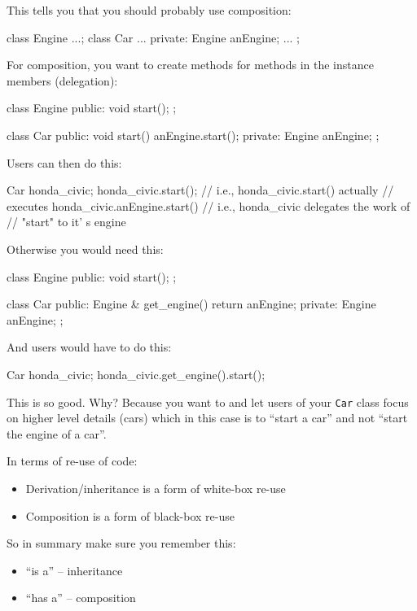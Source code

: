 This tells you that you should probably use composition:
\begin{console}
class Engine {...};
class Car {
...
private:
        Engine anEngine;
        ...
};
\end{console}

For composition, you want to create methods for methods in the instance
members (delegation):
\begin{console}
class Engine {
public:
        void start();
};

class Car {
public:
        void start() { anEngine.start(); }
private:
        Engine anEngine;
};
\end{console}

Users can then do this:
\begin{console}
Car honda_civic;
honda_civic.start();
// i.e., honda_civic.start() actually
// executes honda_civic.anEngine.start()
// i.e., honda_civic delegates the work of
// "start" to it' s engine
\end{console}

Otherwise you would need this:
\begin{console}
class Engine {
public:
        void start();
};

class Car {
public:
        Engine & get_engine() { return anEngine; }
private:
        Engine anEngine;
};
\end{console}

And users would have to do this:
\begin{console}
Car honda_civic;
honda_civic.get_engine().start();
\end{console}

This is  so good. Why? Because you want to  and let users of your \verb!Car! class focus on higher level details (cars) which in this case is to ``start a car'' and not ``start the engine of a car''.

In terms of re-use of code:
\begin{itemize}
\item
  Derivation/inheritance is a form of white-box re-use
\item
  Composition is a form of black-box re-use
\end{itemize}

So in summary make sure you remember this:
\begin{itemize}
\item
  ``is a'' -- inheritance
\item
  ``has a'' -- composition
\end{itemize}

